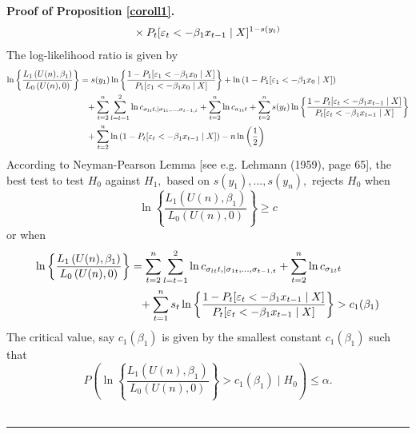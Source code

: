 \documentclass[harvard,11pt]{article}
\newenvironment{proof}[1][Proof]{\textbf{#1.} }{\  \rule{0.5em}{0.5em}}
\begin{document}
\begin{proof}[Proof of Proposition \protect\ref{coroll1}]
\begin{align*}
&\textcolor{white}{=}\times P_t[\varepsilon_t < -\beta_1 x_{t-1}\mid X]^{1-s(y_t)}
\end{align*}
\endgroup
The log-likelihood ratio is given by%
\begingroup
\allowdisplaybreaks
\begin{align*}
\ln \left\{ \frac{L_1\left( U(n),\beta _{1}\right) }{L
_{0}\left( U(n),0\right) }\right\}&=s(y_1)\ln\left\{\frac{1-P_1[\varepsilon_1<-\beta_1 x_0\mid X ]}{P_1[\varepsilon_1 < -\beta_1 x_0\mid X]}\right\}+\ln \left(1-P_1[\varepsilon_1< -\beta_1 x_0\mid X]\right)\\
&\textcolor{white}{=}+\sum\limits_{t=2}^{n}\sum\limits_{l=t-1}^{2}\ln c_{\sigma_{lt}t,\mid \sigma_{1t},...,\sigma_{t-1,t}}+\sum\limits_{t=2}^{n}\ln c_{a_{1t}t}+\sum\limits_{t=2}^{n}s(y_t)\ln\left\{\frac{1-P_t[\varepsilon_t<- \beta_1 x_{t-1}\mid X]}{P_t[\varepsilon_t <-\beta_1 x_{t-1}\mid X]}\right\}\\
&\textcolor{white}{=}+\sum\limits_{t=2}^{n}\ln\left(1- P_t[\varepsilon_t< -\beta_1 x_{t-1}\mid X]\right)-n\ln\left(\frac{1}{2}\right)
\end{align*}
\endgroup
According to Neyman-Pearson Lemma [see e.g. Lehmann (1959), page 65], the
best test to test $H_{0}$ against $H_1,$ based on $s(y_{1}),...,s(y_{n}),$
rejects $H_{0}$ when%
\begin{equation*}
\ln \left\{ \frac{L_1\left( U(n),\beta _{1}\right) }{L_{0}\left( U(n),0\right) }\right\} \geq c
\end{equation*}%
or when%
\begingroup
\allowdisplaybreaks
\begin{align*}
\ln \left\{ \frac{L_1\left( U(n),\beta _{1}\right) }{L
_{0}\left( U(n),0\right) }\right\}&=\sum\limits_{t=2}^{n}\sum\limits_{l=t-1}^{2}\ln c_{\sigma_{lt}t,\mid \sigma_{1t},...,\sigma_{t-1,t}}+\sum\limits_{t=2}^{n}\ln c_{\sigma_{1t}t}\\\
&\textcolor{white}{=}+\sum\limits_{t=1}^{n}s_t\ln\left\{\frac{1-P_t[\varepsilon_t<-\beta_1 x_{t-1}\mid X]}{P_t[\varepsilon_t< -\beta_1 x_{t-1}\mid X]}\right\}>c_1(\beta_1)
\end{align*}
\endgroup
The critical value, say $c_1(\beta_1)$ is given by the smallest constant $c_1(\beta_1)$ such that%
\begin{equation*}
P\left( \ln \left\{ \frac{L_1\left( U(n),\beta
_{1}\right) }{L_{0}\left( U(n),0\right) }\right\} >c_1(\beta_1)\mid
H_{0}\right) \leq \alpha .
\end{equation*}
\end{proof}
\end{document}

